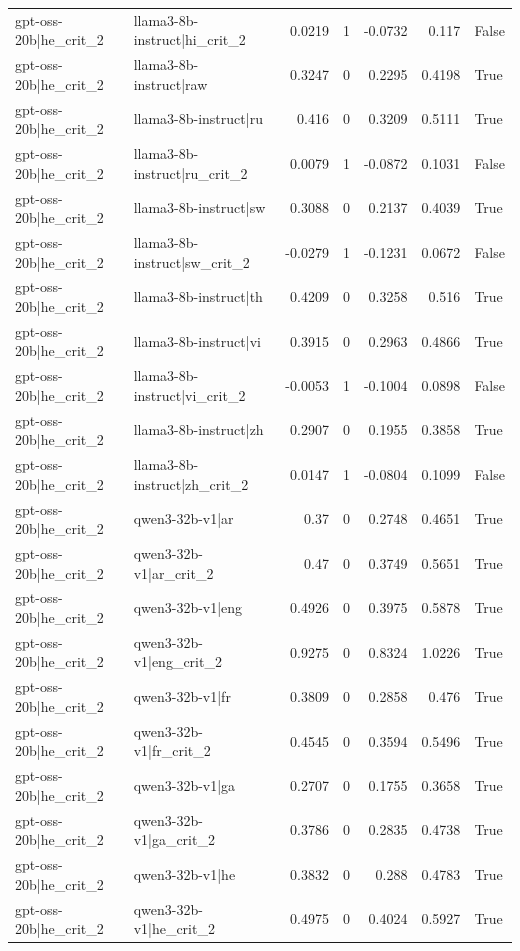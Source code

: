 \begin{table}
\begin{tabular}{l l r r r r l}
gpt-oss-20b|he_crit_2 & llama3-8b-instruct|hi_crit_2 & 0.0219 & 1 & -0.0732 & 0.117 & False \\
gpt-oss-20b|he_crit_2 & llama3-8b-instruct|raw & 0.3247 & 0 & 0.2295 & 0.4198 & True \\
gpt-oss-20b|he_crit_2 & llama3-8b-instruct|ru & 0.416 & 0 & 0.3209 & 0.5111 & True \\
gpt-oss-20b|he_crit_2 & llama3-8b-instruct|ru_crit_2 & 0.0079 & 1 & -0.0872 & 0.1031 & False \\
gpt-oss-20b|he_crit_2 & llama3-8b-instruct|sw & 0.3088 & 0 & 0.2137 & 0.4039 & True \\
gpt-oss-20b|he_crit_2 & llama3-8b-instruct|sw_crit_2 & -0.0279 & 1 & -0.1231 & 0.0672 & False \\
gpt-oss-20b|he_crit_2 & llama3-8b-instruct|th & 0.4209 & 0 & 0.3258 & 0.516 & True \\
gpt-oss-20b|he_crit_2 & llama3-8b-instruct|vi & 0.3915 & 0 & 0.2963 & 0.4866 & True \\
gpt-oss-20b|he_crit_2 & llama3-8b-instruct|vi_crit_2 & -0.0053 & 1 & -0.1004 & 0.0898 & False \\
gpt-oss-20b|he_crit_2 & llama3-8b-instruct|zh & 0.2907 & 0 & 0.1955 & 0.3858 & True \\
gpt-oss-20b|he_crit_2 & llama3-8b-instruct|zh_crit_2 & 0.0147 & 1 & -0.0804 & 0.1099 & False \\
gpt-oss-20b|he_crit_2 & qwen3-32b-v1|ar & 0.37 & 0 & 0.2748 & 0.4651 & True \\
gpt-oss-20b|he_crit_2 & qwen3-32b-v1|ar_crit_2 & 0.47 & 0 & 0.3749 & 0.5651 & True \\
gpt-oss-20b|he_crit_2 & qwen3-32b-v1|eng & 0.4926 & 0 & 0.3975 & 0.5878 & True \\
gpt-oss-20b|he_crit_2 & qwen3-32b-v1|eng_crit_2 & 0.9275 & 0 & 0.8324 & 1.0226 & True \\
gpt-oss-20b|he_crit_2 & qwen3-32b-v1|fr & 0.3809 & 0 & 0.2858 & 0.476 & True \\
gpt-oss-20b|he_crit_2 & qwen3-32b-v1|fr_crit_2 & 0.4545 & 0 & 0.3594 & 0.5496 & True \\
gpt-oss-20b|he_crit_2 & qwen3-32b-v1|ga & 0.2707 & 0 & 0.1755 & 0.3658 & True \\
gpt-oss-20b|he_crit_2 & qwen3-32b-v1|ga_crit_2 & 0.3786 & 0 & 0.2835 & 0.4738 & True \\
gpt-oss-20b|he_crit_2 & qwen3-32b-v1|he & 0.3832 & 0 & 0.288 & 0.4783 & True \\
gpt-oss-20b|he_crit_2 & qwen3-32b-v1|he_crit_2 & 0.4975 & 0 & 0.4024 & 0.5927 & True \\

\end{tabular}
\end{table}
